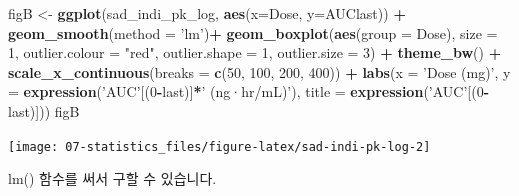 \documentclass[12pt,]{krantz}
\newenvironment{Shaded}{\begin{snugshade}}{\end{snugshade}}
\newcommand{\DataTypeTok}[1]{\textcolor[rgb]{0.13,0.29,0.53}{#1}}
\newcommand{\DecValTok}[1]{\textcolor[rgb]{0.00,0.00,0.81}{#1}}
\newcommand{\KeywordTok}[1]{\textcolor[rgb]{0.13,0.29,0.53}{\textbf{#1}}}
\newcommand{\NormalTok}[1]{#1}
\newcommand{\OperatorTok}[1]{\textcolor[rgb]{0.81,0.36,0.00}{\textbf{#1}}}
\newcommand{\StringTok}[1]{\textcolor[rgb]{0.31,0.60,0.02}{#1}}
\begin{document}
\begin{Shaded}
\begin{Highlighting}[]
\NormalTok{figB <-}\StringTok{ }\KeywordTok{ggplot}\NormalTok{(sad_indi_pk_log, }\KeywordTok{aes}\NormalTok{(}\DataTypeTok{x=}\NormalTok{Dose, }\DataTypeTok{y=}\NormalTok{AUClast)) }\OperatorTok{+}
\StringTok{  }\KeywordTok{geom_smooth}\NormalTok{(}\DataTypeTok{method =} \StringTok{'lm'}\NormalTok{)}\OperatorTok{+}
\StringTok{  }\KeywordTok{geom_boxplot}\NormalTok{(}\KeywordTok{aes}\NormalTok{(}\DataTypeTok{group =}\NormalTok{ Dose), }
               \DataTypeTok{size =} \DecValTok{1}\NormalTok{, }
               \DataTypeTok{outlier.colour =} \StringTok{"red"}\NormalTok{, }
               \DataTypeTok{outlier.shape =} \DecValTok{1}\NormalTok{, }
               \DataTypeTok{outlier.size =} \DecValTok{3}\NormalTok{) }\OperatorTok{+}
\StringTok{  }\KeywordTok{theme_bw}\NormalTok{() }\OperatorTok{+}
\StringTok{  }\KeywordTok{scale_x_continuous}\NormalTok{(}\DataTypeTok{breaks =} \KeywordTok{c}\NormalTok{(}\DecValTok{50}\NormalTok{, }\DecValTok{100}\NormalTok{, }\DecValTok{200}\NormalTok{, }\DecValTok{400}\NormalTok{)) }\OperatorTok{+}
\StringTok{  }\KeywordTok{labs}\NormalTok{(}\DataTypeTok{x =} \StringTok{'Dose (mg)'}\NormalTok{, }\DataTypeTok{y =} \KeywordTok{expression}\NormalTok{(}\StringTok{'AUC'}\NormalTok{[(}\DecValTok{0}\OperatorTok{-}\NormalTok{last)]}\OperatorTok{*}\StringTok{' (ng·hr/mL)'}\NormalTok{),}
       \DataTypeTok{title =} \KeywordTok{expression}\NormalTok{(}\StringTok{'AUC'}\NormalTok{[(}\DecValTok{0}\OperatorTok{-}\NormalTok{last)]))}
\NormalTok{figB}
\end{Highlighting}
\end{Shaded}

\texttt{[image: 07-statistics\_files/figure-latex/sad-indi-pk-log-2]}

lm() 함수를 써서 구할 수 있습니다.
\end{document}
